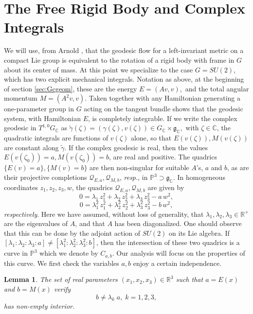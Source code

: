 \documentclass[12pt,reqno]{amsart}\usepackage{amssymb,amsmath,amscd,epsfig,amsthm,enumerate,import,eufrak}
\newtheorem{lemma}[theorem]{Lemma}
\theoremstyle{definition}
\theoremstyle{remark}
\numberwithin{equation}{section}
\theoremstyle{plain}
\theoremstyle{definition}
\def \r {\mathbb{R}}
\def \c {\mathbb{C}}
\def \p {\mathbb{P}}
\def \q {\mathcal{Q}}
\def \mfg {\mathfrak{g}}
\def \vs {\vskip 2mm}
\theoremstyle{remark}
\numberwithin{theorem}{section}
\begin{document}
\section{The Free Rigid Body and Complex Integrals}\label{sec:complexintegrals}
%
\vs
%
We will use, from Arnold \cite{via}, that the geodesic flow for a left-invariant metric on a compact Lie group is equivalent to the rotation of a rigid body with frame in $G$ about its center of mass. At this point we specialize to the case $G = SU(2)$, which has two explicit mechanical integrals.  Notation as above, at the beginning of section \ref{sec:Gcgeom}, these are the energy $E = (Av,v),$ and the total angular momentum $M = (A^2v,v)$. Taken together with any Hamiltonian generating a one-parameter group in $G$ acting on the tangent bundle shows that the geodesic system, with Hamiltonian $E$, is completely integrable. If we write the complex geodesic in $T^{1,0}G_{\c}$ as $\tilde{\gamma}(\zeta)  = (\gamma(\zeta), v(\zeta)) \in G_{\c} \times \mfg_{\c},$ with $\zeta \in \c$, the quadratic integrals are functions of $v(\zeta)$ alone, so that $E(v(\zeta)), M(v(\zeta))$ are constant along $\tilde{\gamma}$. If the complex geodesic is real, then the values $E(v(\zeta_0)) = a, M(v(\zeta_0)) = b$, are real and positive. The quadrics $\{ E(v) = a\}, \{M(v) = b\}$ are then non-singular for suitable $A$'s, $a$ and $b$, as are their projective completions $\q_{E,a}, \q_{M,b}$, {\em resp.}, in $\p^3 \supset \mfg_{\c}$. In homogeneous coordinates $z_1, z_2, z_3, w$, the quadrics $\q_{E,a}, \q_{M,b}$ are given by 
%
\vs
%
\begin{equation} \label{eqn:qe}
	0 = \lambda_1 \, z_1^2 + \lambda_2 \, z_2^2 + \lambda_3 \, z_3^2 - a \, w^2,
\end{equation}
%
\begin{equation} \label{eqn:qm}
	0 = \lambda_1^2 \, z_1^2 + \lambda_2^2 \, z_2^2 + \lambda_3^2 \, z_3^2 - b \, w^2,
\end{equation}\vs
%
{\em respectively}. Here we have assumed, without loss of generality, that $\lambda_1, \lambda_2, \lambda_3 \in \r^+$ are the eigenvalues of $A$, and that $A$ has been diagonalized. One should observe that this can be done by the adjoint action of $SU(2)$ on its Lie algebra. If $[\lambda_1: \lambda_2: \lambda_3: a] \neq [\lambda_1^2: \lambda_2^2: \lambda_3^2: b]$, then the intersection of these two quadrics is a curve in $\p^3$ which we denote by $C_{a,b}$. Our analysis will focus on the properties of this curve. We first check the variables $a, b$ enjoy a certain independence. 
\vs
\begin{lemma} \label{lem:gpab}
	The set of real parameters $(x_1, x_2, x_3) \in \r^3$ such that $a = E(x)$ and $b = M(x)$ verify 
	\begin{equation} \label{eqn:ineq}
		b \neq \lambda_k \; a, \; k = 1, 2, 3,
	\end{equation}
has non-empty interior.
\end{lemma}
\end{document}
